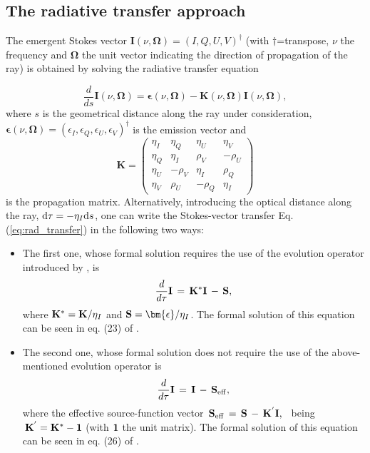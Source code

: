\documentclass[12pt]{article}
\begin{document}
\subsection{The radiative transfer approach}
\label{sec:radiative_transfer}
The emergent Stokes vector $\mathbf{I}(\nu,\mathbf{\Omega})=(I,Q,U,V)^{\dag}$
(with $\dag$=transpose, $\nu$ the frequency and $\mathbf{\Omega}$ the unit vector indicating 
the direction of propagation of the ray) is obtained by solving the radiative transfer equation

\begin{equation}
\frac{d}{ds}\mathbf{I}(\nu,\mathbf{\Omega}) =
\bm{\epsilon}(\nu,\mathbf{\Omega}) - \mathbf{K}(\nu,\mathbf{\Omega}) 
\mathbf{I}(\nu,\mathbf{\Omega}),
\label{eq:rad_transfer}
\end{equation}
where $s$ is the geometrical distance along the ray under consideration,
$\bm{\epsilon}(\nu,\mathbf{\Omega})=({\epsilon}_I,{\epsilon}_Q,{\epsilon
}_U,{\epsilon}_V)^{\dag}$ is the emission vector and
\begin{equation}
\mathbf{K} = \left( \begin{array}{cccc}
\eta_I & \eta_Q & \eta_U & \eta_V \\
\eta_Q & \eta_I & \rho_V & -\rho_U \\
\eta_U & -\rho_V & \eta_I & \rho_Q \\
\eta_V & \rho_U & -\rho_Q & \eta_I
\end{array} \right)
\label{eq:propagation}
\end{equation}
is the propagation matrix. Alternatively, introducing the optical distance along the ray,  
${\rm d}{\tau}=-{\eta_I}{\rm d}s$, one can write the Stokes-vector 
transfer Eq. (\ref{eq:rad_transfer}) in the following two ways:

\begin{itemize}

\item The first one, whose formal solution requires the use of the evolution operator introduced by \cite{landi_landi85}, is 
\begin{equation}
{{d}\over{d{\tau}}}{\bf I}\,=\,{\bf K}^{*}
{\bf I}\,-\,{\bf S}, 
\label{eq:rad_transfer_peo}
\end{equation}
where ${\bf K}^{*}={\bf K}/{\eta_I}$ and ${\bf S}=\bm{\epsilon}/{\eta_I}$. 
The formal solution of this equation can be seen in eq. (23) of \cite{trujillo03}.

\item The second one, whose formal solution does not require the use of the above-mentioned evolution operator is \citep[e.g.,][]{rees_delo89}
\begin{equation}
{{d}\over{d{\tau}}}{\bf I}\,=\,{\bf I}\,-\,{\bf S}_{\rm eff},  
\label{eq:rad_transfer_delo}
\end{equation}
where the effective source-function vector
$\,{\bf S}_{\rm eff}\,=\,{\bf S}\,-\,
{\bf K}^{'}{\bf I},\,\,\,$ being $\,{\bf K}^{'}={\bf K}^{*}-{\bf 1}$
(with $\bf 1$ the unit matrix). The formal solution of this equation can be seen in eq. (26) of \cite{trujillo03}.

\end{itemize}
\end{document}
